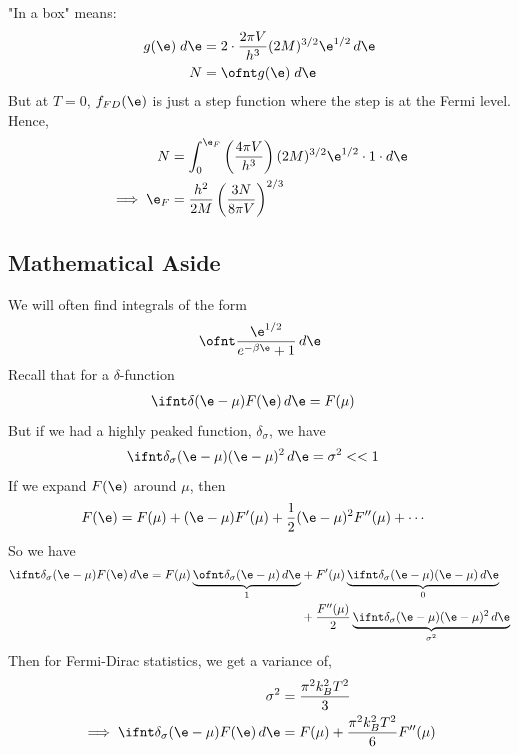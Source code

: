 \documentclass[a4paper, 11pt, normalem]{report}
\begin{document}
\begin{example}[At $T=0$, calculate the Fermi level for Fermions in a box of volume, $V$.]
"In a box" means:
\begin{align}
    g(\e)\;d\e &= 2\cdot\frac{2\pi V}{h^3}(2M)^{3/2} \e^{1/2}\,d\e \\
    N &= \ofnt g(\e)\;d\e
\end{align}
But at $T=0$, $f_{FD}(\e)$ is just a step function where the step is at the Fermi level.
Hence, 
\begin{align}
    N &= \int_0^{\e_F} \left(\frac{4\pi V}{h^3}\right)(2M)^{3/2}\e^{1/2}\cdot1\cdot d\e \\
    \implies \e_F &= \frac{h^2}{2M}\left(\frac{3N}{8\pi V}\right)^{2/3}
\end{align}
\end{example}

\subsection{Mathematical Aside}
We will often find integrals of the form
\begin{align}
    \ofnt \frac{\e^{1/2}}{e^{-\beta\e} + 1}\,d\e
\end{align}
Recall that for a $\delta$-function
\begin{align}
    \ifnt \delta(\e-\mu)F(\e)\,d\e &= F(\mu)
\end{align}
But if we had a highly peaked function, $\delta_\sigma$, we have
\begin{align}
    \ifnt \delta_\sigma(\e-\mu)(\e-\mu)^2\,d\e &= \sigma^2 << 1
\end{align}
If we expand $F(\e)$ around $\mu$, then 
\begin{align}
    F(\e) &= F(\mu) + (\e-\mu)F'(\mu) + \frac{1}{2}(\e-\mu)^2F''(\mu) + \cdots 
\end{align}
So we have
\begin{align}
    \begin{split}
        \ifnt \delta_\sigma(\e-\mu)F(\e)\,d\e = F(\mu)\underbrace{\ofnt \delta_\sigma(\e-\mu)\,d\e}_{1} &+ F'(\mu)\underbrace{\ifnt \delta_\sigma(\e-\mu)(\e-\mu)\,d\e}_{0} \\ &+ \frac{F''(\mu)}{2}\underbrace{\ifnt \delta_\sigma(\e-\mu)(\e-\mu)^2\,d\e}_{\sigma^2}
    \end{split}
\end{align}
Then for Fermi-Dirac statistics, we get a variance of, 
\begin{align}
    \sigma^2 &= \frac{\pi^2k_B^2T^2}{3} \\
    \implies \ifnt \delta_\sigma(\e-\mu)F(\e)\,d\e &= F(\mu) + \frac{\pi^2k_B^2T^2}{6}F''(\mu)
\end{align}
\end{document}
